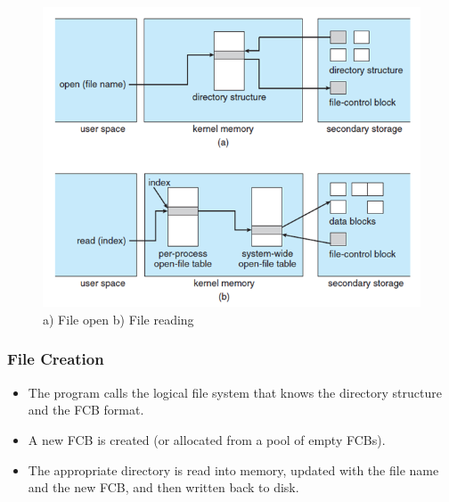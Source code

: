 \documentclass{article}
\theoremstyle{plain}
\theoremstyle{definition}
\begin{document}
\begin{figure}[!h]
    \centering
    \includegraphics[scale=0.7]{os7.png}
    \caption{a) File open b) File reading}
    \label{fig:my_label_18}
\end{figure}

\subsubsection{File Creation}
\begin{itemize}
    
    \item The program calls the logical file system that knows the directory structure and the FCB format.
    
    \item A new FCB is created (or allocated from a pool of empty FCBs).
    
    \item The appropriate directory is read into memory, updated with the file name and the new FCB, and then written back to disk.
\end{itemize}
\end{document}
